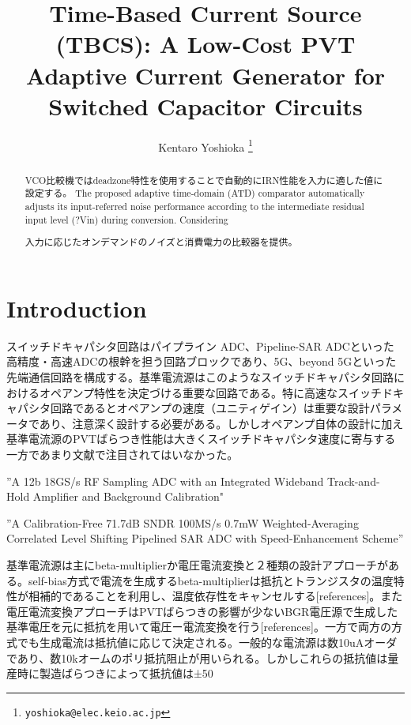\documentclass[letterpaper, 10 pt, conference]{ieeeconf}  %
\title{\LARGE \bf
Time-Based Current Source (TBCS): A Low-Cost PVT Adaptive Current Generator for Switched Capacitor Circuits
}
\author{Kentaro Yoshioka%
\thanks{
        {\tt\small yoshioka@elec.keio.ac.jp}}
}
\begin{document}
\maketitle
\thispagestyle{empty}
\pagestyle{empty}

\begin{abstract}
VCO比較機ではdeadzone特性を使用することで自動的にIRN性能を入力に適した値に設定する。
The proposed adaptive time-domain (ATD) comparator automatically adjusts its input-referred noise performance according to the intermediate residual input level (?Vin) during conversion. Considering

入力に応じたオンデマンドのノイズと消費電力の比較器を提供。


\end{abstract}

\section{Introduction}
スイッチドキャパシタ回路はパイプライン ADC、Pipeline-SAR ADCといった高精度・高速ADCの根幹を担う回路ブロックであり、5G、beyond 5Gといった先端通信回路を構成する。基準電流源はこのようなスイッチドキャパシタ回路におけるオペアンプ特性を決定づける重要な回路である。特に高速なスイッチドキャパシタ回路であるとオペアンプの速度（ユニティゲイン）は重要な設計パラメータであり、注意深く設計する必要がある。しかしオペアンプ自体の設計に加え基準電流源のPVTばらつき性能は大きくスイッチドキャパシタ速度に寄与する一方であまり文献で注目されてはいなかった。

”A 12b 18GS/s RF Sampling ADC with an Integrated Wideband Track-and-
 Hold Amplifier and Background Calibration"

”A Calibration-Free 71.7dB SNDR 100MS/s 0.7mW Weighted-Averaging Correlated Level Shifting Pipelined SAR ADC with Speed-Enhancement Scheme”

基準電流源は主にbeta-multiplierか電圧電流変換と２種類の設計アプローチがある。self-bias方式で電流を生成するbeta-multiplierは抵抗とトランジスタの温度特性が相補的であることを利用し、温度依存性をキャンセルする[references]。また電圧電流変換アプローチはPVTばらつきの影響が少ないBGR電圧源で生成した基準電圧を元に抵抗を用いて電圧ー電流変換を行う[references]。一方で両方の方式でも生成電流は抵抗値に応じて決定される。一般的な電流源は数10uAオーダであり、数10kオームのポリ抵抗阻止が用いられる。しかしこれらの抵抗値は量産時に製造ばらつきによって抵抗値は±50%
\end{document}
